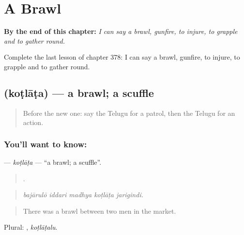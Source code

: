 
\chapter{A Brawl}
\label{ch:te-a-brawl}

\begin{chapteropening}
\textbf{By the end of this chapter:} \emph{I can say a brawl, gunfire, to injure, to grapple and to gather round.}

Complete the last lesson of chapter 378: I can say a brawl, gunfire, to injure, to grapple and to gather round.
\end{chapteropening}

\section[\texorpdfstring{\te{కొట్లాట} (koṭlāṭa)}{కొట్లాట (koṭlāṭa)}]{ (koṭlāṭa) — a brawl; a scuffle}

\label{lesson:TE-C378-kotlata}



\begin{quote}
Before the new one: say the Telugu for a patrol, then the Telugu for an action.
\end{quote}

\subsection*{You'll want to know: }
\textbf{} — \emph{koṭlāṭa} — \textquotedblleft{}a brawl; a scuffle\textquotedblright{}.

\begin{quote}
    .
\end{quote}

\begin{quote}
\emph{bajārulō iddari madhya koṭlāṭa jarigindi.}
\end{quote}

\begin{quote}
There was a brawl between two men in the market.
\end{quote}

Plural: , \emph{koṭlāṭalu}.

